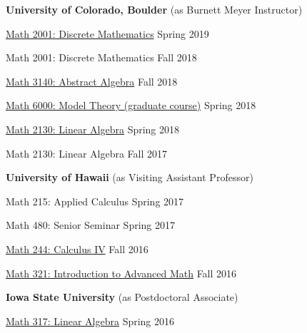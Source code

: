 \newcommand\myskip{-2mm}
\textbf{University of Colorado, Boulder} {\small (as Burnett Meyer Instructor)}

\newcommand\cors[2]{#1: #2}
\newcommand\crsu[3]{\href{#3}{#1: #2}}
\newcommand\semr[1]{\hfill \nosmall #1}
    
\vspace\myskip

\crsu{Math 2001}
     {Discrete Mathematics}
     {https://github.com/williamdemeo/math2001-spring2019}
\semr{Spring 2019}

\vspace\myskip

\cors{Math 2001}
     {Discrete Mathematics}
\semr{Fall 2018}

\vspace\myskip

\crsu{Math 3140}
     {Abstract Algebra}
     {https://github.com/williamdemeo/math3140-fall2018}
\semr{Fall 2018}

\vspace\myskip

\crsu{Math 6000}
     {Model Theory (graduate course)}
     {https://github.com/williamdemeo/math6000-spring2018}
\semr{Spring 2018}

\vspace\myskip

\crsu{Math 2130}{Linear Algebra}
     {https://github.com/williamdemeo/math2130-spring2018}
     \semr{Spring 2018}

     \vspace\myskip

\cors{Math 2130}{Linear Algebra}
\semr{Fall 2017}
    



\textbf{University of Hawaii} {\small (as Visiting Assistant Professor)}

\vspace\myskip
\cors{Math 215}{Applied Calculus} \semr{Spring 2017}

\vspace\myskip
\cors{Math 480}{Senior Seminar} \semr{Spring 2017}

\vspace\myskip
\crsu{Math 244}
     {Calculus IV}
     {https://github.com/williamdemeo/math244-fall2016}
\semr{Fall 2016}

\vspace\myskip

\crsu{Math 321}{Introduction to Advanced Math}
     {https://github.com/williamdemeo/math321-fall2016}
\semr{Fall 2016}


\textbf{Iowa State University} {\small (as Postdoctoral Associate)}

\vspace\myskip
\crsu{Math 317}{Linear Algebra}{https://github.com/williamdemeo/Math317-Spring2016}
\semr{Spring 2016}

